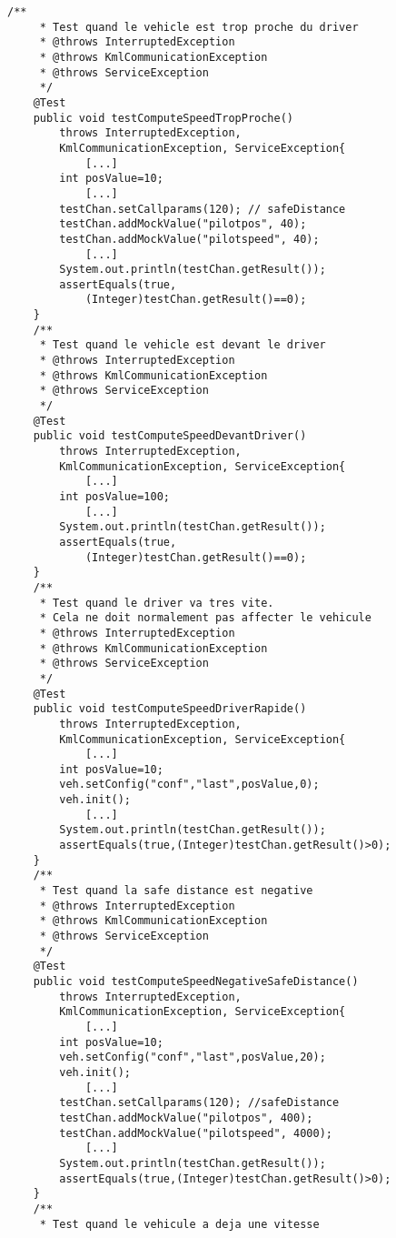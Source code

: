 \begin{lstlisting}[frame=single, caption={TestOnComputeSpeed.java},label=fig:JUnitTestOnComputeSpeed]
    /**
     * Test quand le vehicle est trop proche du driver
     * @throws InterruptedException
     * @throws KmlCommunicationException
     * @throws ServiceException
     */
    @Test
    public void testComputeSpeedTropProche() 
        throws InterruptedException, 
        KmlCommunicationException, ServiceException{	
            [...]
        int posValue=10;	
            [...]
        testChan.setCallparams(120); // safeDistance
        testChan.addMockValue("pilotpos", 40);
        testChan.addMockValue("pilotspeed", 40);	
            [...]
        System.out.println(testChan.getResult());
        assertEquals(true,
            (Integer)testChan.getResult()==0);
    }	
    /**
     * Test quand le vehicle est devant le driver
     * @throws InterruptedException
     * @throws KmlCommunicationException
     * @throws ServiceException
     */
    @Test
    public void testComputeSpeedDevantDriver() 
        throws InterruptedException, 
        KmlCommunicationException, ServiceException{	
            [...]
        int posValue=100;	
            [...]
        System.out.println(testChan.getResult());
        assertEquals(true,
            (Integer)testChan.getResult()==0);
    }	
    /**
     * Test quand le driver va tres vite.
     * Cela ne doit normalement pas affecter le vehicule
     * @throws InterruptedException
     * @throws KmlCommunicationException
     * @throws ServiceException
     */
    @Test
    public void testComputeSpeedDriverRapide()
        throws InterruptedException, 
        KmlCommunicationException, ServiceException{	
            [...]
        int posValue=10;
        veh.setConfig("conf","last",posValue,0);
        veh.init();	
            [...]
        System.out.println(testChan.getResult());
        assertEquals(true,(Integer)testChan.getResult()>0);
    }	
    /**
     * Test quand la safe distance est negative
     * @throws InterruptedException
     * @throws KmlCommunicationException
     * @throws ServiceException
     */
    @Test
    public void testComputeSpeedNegativeSafeDistance() 
        throws InterruptedException, 
        KmlCommunicationException, ServiceException{	
            [...]
        int posValue=10;		
        veh.setConfig("conf","last",posValue,20);
        veh.init();	
            [...]
        testChan.setCallparams(120); //safeDistance
        testChan.addMockValue("pilotpos", 400);
        testChan.addMockValue("pilotspeed", 4000);	
            [...]
        System.out.println(testChan.getResult());
        assertEquals(true,(Integer)testChan.getResult()>0);	
	}	
    /**
     * Test quand le vehicule a deja une vitesse

\end{lstlisting}
